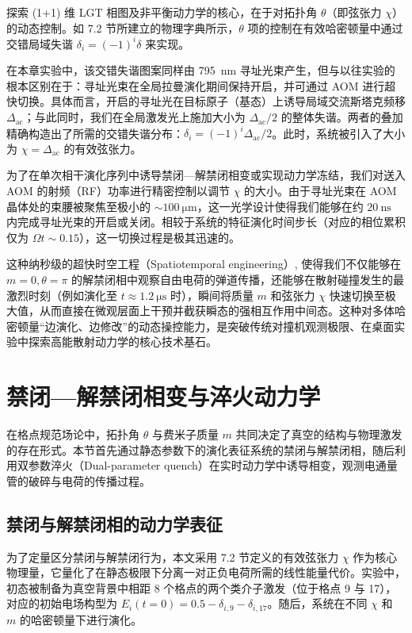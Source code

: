 \documentclass[../main.tex]{subfiles}
\begin{document}
探索 (1+1) 维 LGT 相图及非平衡动力学的核心，在于对拓扑角 $\theta$（即弦张力 $\chi$）的动态控制。如 7.2 节所建立的物理字典所示，$\theta$ 项的控制在有效哈密顿量中通过交错局域失谐 $\delta_i=(-1)^i\delta$ 来实现。

在本章实验中，该交错失谐图案同样由 \SI{795}{\nm} 寻址光束产生，但与以往实验的根本区别在于：寻址光束在全局拉曼演化期间保持开启，并可通过 AOM 进行超快切换。具体而言，开启的寻址光在目标原子（基态）上诱导局域交流斯塔克频移 $\Delta_\mathrm{ac}$；与此同时，我们在全局激发光上施加大小为 $\Delta_\mathrm{ac}/2$ 的整体失谐。两者的叠加精确构造出了所需的交错失谐分布：$\delta_i=(-1)^i\Delta_\mathrm{ac}/2$。此时，系统被引入了大小为 $\chi = \Delta_\mathrm{ac}$ 的有效弦张力。

为了在单次相干演化序列中诱导禁闭—解禁闭相变或实现动力学冻结，我们对送入 AOM 的射频（RF）功率进行精密控制以调节 $\chi$ 的大小。由于寻址光束在 AOM 晶体处的束腰被聚焦至极小的 $\sim \SI{100}{\micro\meter}$，这一光学设计使得我们能够在约 $\SI{20}{\nano\second}$ 内完成寻址光束的开启或关闭。相较于系统的特征演化时间步长（对应的相位累积仅为 $\Omega t \sim 0.15$），这一切换过程是极其迅速的。

这种纳秒级的超快时空工程（Spatiotemporal engineering）, 使得我们不仅能够在 $m=0, \theta=\pi$ 的解禁闭相中观察自由电荷的弹道传播，还能够在散射碰撞发生的最激烈时刻（例如演化至 $t \approx \SI{1.2}{\micro\second}$ 时），瞬间将质量 $m$ 和弦张力 $\chi$ 快速切换至极大值，从而直接在微观层面上干预并截获瞬态的强相互作用中间态。这种对多体哈密顿量“边演化、边修改”的动态操控能力，是突破传统对撞机观测极限、在桌面实验中探索高能散射动力学的核心技术基石。



\section{禁闭—解禁闭相变与淬火动力学}

在格点规范场论中，拓扑角 $\theta$ 与费米子质量 $m$ 共同决定了真空的结构与物理激发的存在形式。本节首先通过静态参数下的演化表征系统的禁闭与解禁闭相，随后利用双参数淬火（Dual-parameter quench）在实时动力学中诱导相变，观测电通量管的破碎与电荷的传播过程。

\subsection{禁闭与解禁闭相的动力学表征}

为了定量区分禁闭与解禁闭行为，本文采用 7.2 节定义的有效弦张力 $\chi$ 作为核心物理量，它量化了在静态极限下分离一对正负电荷所需的线性能量代价。实验中，初态被制备为真空背景中相距 8 个格点的两个类介子激发（位于格点 9 与 17），对应的初始电场构型为 $E_i(t=0)=0.5-\delta_{i,9}-\delta_{i,17}$。随后，系统在不同 $\chi$ 和 $m$ 的哈密顿量下进行演化。
\end{document}
